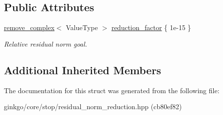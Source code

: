\subsection*{Public Attributes}
\begin{DoxyCompactItemize}
\item 
\mbox{\label{structgko_1_1stop_1_1ResidualNormReduction_1_1parameters__type_a488ffd39d7ea7fc9093a0e7604be2746}} 
\hyperlink{namespacegko_adfcb75c44f6b6c701989419c166f6e7e}{remove\+\_\+complex}$<$ Value\+Type $>$ \hyperlink{structgko_1_1stop_1_1ResidualNormReduction_1_1parameters__type_a488ffd39d7ea7fc9093a0e7604be2746}{reduction\+\_\+factor} \{ 1e-\/15 \}
\begin{DoxyCompactList}\small\item\em Relative residual norm goal. \end{DoxyCompactList}\end{DoxyCompactItemize}
\subsection*{Additional Inherited Members}


The documentation for this struct was generated from the following file\+:\begin{DoxyCompactItemize}
\item 
ginkgo/core/stop/residual\+\_\+norm\+\_\+reduction.\+hpp (cb80ef82)\end{DoxyCompactItemize}
